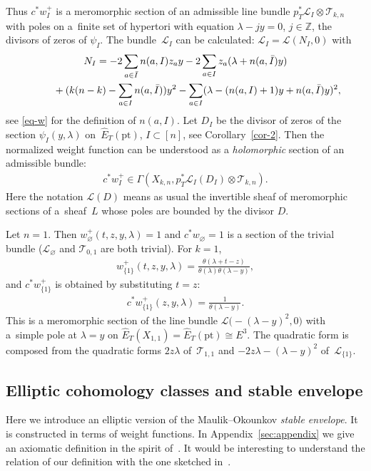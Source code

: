 \documentclass[pdftex]{sigma}
\numberwithin{equation}{section}
\begin{document}
Thus $c ^*w_I^+$ is a meromorphic section of an admissible line bundle $p_T^*\mathcal L_I\otimes \mathcal T_{k,n}$ with poles on a~finite set of hypertori with equation $\lambda-jy=0$, $j\in\mathbb Z$, the divisors of zeros of $\psi_I$. The bundle~$\mathcal L_I$ can be calculated: $\mathcal L_I=\mathcal L(N_I,0)$ with
\begin{gather}
 N_I=-2\sum_{a\in\bar I}n(a,I)z_ay-2\sum_{a\in I}z_a(\lambda+n(a,\bar I)y)\nonumber\\
\hphantom{N_I=}{} +(k(n-k)-\sum_{a\in I}n(a,\bar I))y^2-\sum_{a\in I}(\lambda- (n(a,I)+1)y+n(a,\bar I)y)^2,\label{e-NI}
\end{gather}
see \eqref{eq-w} for the definition of $n(a,I)$. Let $D_I$ be the divisor of zeros of the section $\psi_I(y,\lambda)$ on~$\hat E_T(\mathrm{pt})$, $I\subset [n]$, see Corollary~\ref{cor-2}. Then the normalized weight function can be understood as a {\em holomorphic} section of an admissible bundle:
\begin{gather*}
c ^*w^+_I\in\Gamma(X_{k,n}, p_T^*\mathcal L_I(D_I)\otimes\mathcal T_{k,n}).
\end{gather*}
Here the notation $\mathcal L(D)$ means as usual the invertible sheaf of meromorphic sections of a~sheaf~$L$ whose poles are bounded by the divisor $D$.
\begin{Example} Let $n=1$. Then $w^+_\varnothing(t,z,y,\lambda)=1$ and $c ^*w_\varnothing=1$ is a section of the trivial bundle ($\mathcal L_{\varnothing}$ and $\mathcal T_{0,1}$ are both trivial). For $k=1$,
\begin{gather*}
w^+_{\{1\}}(t,z,y,\lambda)=\frac{\theta(\lambda+t-z)}{\theta(\lambda)\theta(\lambda-y)},
\end{gather*}
and $c ^*w^+_{\{1\}}$ is obtained by substituting $t=z$:
\begin{gather*}
c ^*w^+_{\{1\}}(z,y,\lambda)=\frac1{\theta(\lambda-y)}.
\end{gather*}
This is a meromorphic section of the line bundle $\mathcal L\big({-}(\lambda-y)^2,0\big)$ with a~simple pole at $\lambda=y$ on $\hat E_T(X_{1,1})=\hat E_T(\mathrm{pt})\cong E^3$. The quadratic form is composed from the quadratic forms $2z\lambda$ of~$\mathcal T_{1,1}$ and $\mathcal -2z\lambda-(\lambda-y)^2$ of~$\mathcal L_{\{1\}}$.
\end{Example}
\subsection{Elliptic cohomology classes and stable envelope}\label{ss-5.5}
Here we introduce an elliptic version of the Maulik--Okounkov {\em stable envelope}. It is constructed in terms of weight functions. In Appendix~\ref{sec:appendix} we give an axiomatic definition in the spirit of~\cite{MO}. It would be interesting to understand the relation of our definition with the one sketched in~\cite{AO}.
\end{document}
